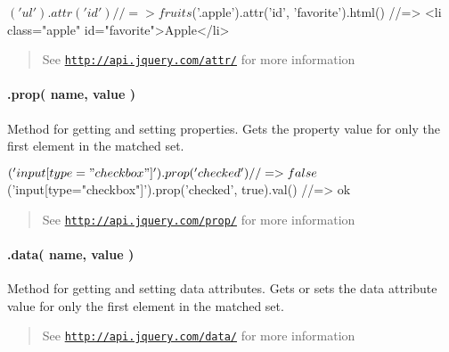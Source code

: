 \begin{DoxyCode}
$('ul').attr('id')
//=> fruits

$('.apple').attr('id', 'favorite').html()
//=> <li class="apple" id="favorite">Apple</li>
\end{DoxyCode}


\begin{quote}
See \href{http://api.jquery.com/attr/}{\tt http\+://api.\+jquery.\+com/attr/} for more information \end{quote}


\paragraph*{.prop( name, value )}

Method for getting and setting properties. Gets the property value for only the first element in the matched set.


\begin{DoxyCode}
$('input[type="checkbox"]').prop('checked')
//=> false

$('input[type="checkbox"]').prop('checked', true).val()
//=> ok
\end{DoxyCode}


\begin{quote}
See \href{http://api.jquery.com/prop/}{\tt http\+://api.\+jquery.\+com/prop/} for more information \end{quote}


\paragraph*{.data( name, value )}

Method for getting and setting data attributes. Gets or sets the data attribute value for only the first element in the matched set.




\begin{quote}
See \href{http://api.jquery.com/data/}{\tt http\+://api.\+jquery.\+com/data/} for more information \end{quote}


